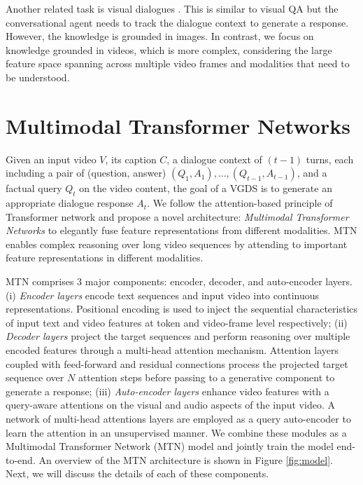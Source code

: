 \documentclass[11pt,a4paper]{article}
\begin{document}
Another related task is visual dialogues \cite{das2017visual,das2017learning,kottur2018visual}. This is similar to visual QA but the conversational agent needs to track the dialogue context to generate a response. However, the knowledge is grounded in images. In contrast, we focus on knowledge grounded in videos, which is more complex, considering the large feature space spanning across multiple video frames and modalities that need to be understood. 

\section{Multimodal Transformer Networks}

Given an input video $V$, its caption $C$, a dialogue context of $(t-1)$ turns, each including a pair of (question, answer) $(Q_1, A_1),...,(Q_{t-1},A_{t-1})$, and a factual query $Q_t$ on the video content, the goal of a VGDS is to generate an appropriate dialogue response $A_t$. We follow the attention-based principle of Transformer network \cite{vaswani17attention}  and propose a novel architecture: \textit{Multimodal Transformer Networks} to elegantly fuse feature representations from different modalities. MTN enables complex reasoning over long video sequences by attending to important feature representations in different modalities. 

MTN comprises 3 major components: encoder, decoder, and auto-encoder layers. (i) \textit{Encoder layers} encode text sequences and input video into continuous representations. Positional encoding is used to inject the sequential characteristics of input text and video features at token and video-frame level respectively;  (ii) \textit{Decoder layers} project the target sequences and perform reasoning over multiple encoded features through a multi-head attention mechanism. Attention layers coupled with feed-forward and residual connections process the projected target sequence over $N$ attention steps before passing to a generative component to generate a response; (iii) \textit{Auto-encoder layers} enhance video features with a query-aware attentions on the visual and audio aspects of the input video. A network of multi-head attentions layers are employed as a query auto-encoder to learn the attention in an unsupervised manner. We combine these modules as a Multimodal Transformer Network (MTN) model and jointly train the model end-to-end. An overview of the MTN architecture is shown in Figure \ref{fig:model}. Next, we will discuss the details of each of these components.
\end{document}
